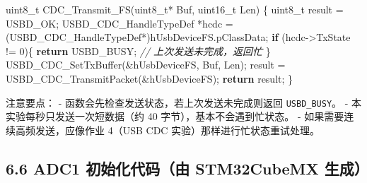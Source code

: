 \documentclass[
  chinese,
  UTF8,
  oneside,
  openany]{ctexbook}
\newenvironment{Shaded}{}{}
\newcommand{\CommentTok}[1]{\textcolor[rgb]{0.38,0.63,0.69}{\textit{#1}}}
\newcommand{\ControlFlowTok}[1]{\textcolor[rgb]{0.00,0.44,0.13}{\textbf{#1}}}
\newcommand{\DataTypeTok}[1]{\textcolor[rgb]{0.56,0.13,0.00}{#1}}
\newcommand{\DecValTok}[1]{\textcolor[rgb]{0.25,0.63,0.44}{#1}}
\newcommand{\NormalTok}[1]{#1}
\newcommand{\OperatorTok}[1]{\textcolor[rgb]{0.40,0.40,0.40}{#1}}
\begin{document}
\begin{Shaded}
\begin{Highlighting}[]
\DataTypeTok{uint8\_t}\NormalTok{ CDC\_Transmit\_FS}\OperatorTok{(}\DataTypeTok{uint8\_t}\OperatorTok{*}\NormalTok{ Buf}\OperatorTok{,} \DataTypeTok{uint16\_t}\NormalTok{ Len}\OperatorTok{)}
\OperatorTok{\{}
    \DataTypeTok{uint8\_t}\NormalTok{ result }\OperatorTok{=}\NormalTok{ USBD\_OK}\OperatorTok{;}
\NormalTok{    USBD\_CDC\_HandleTypeDef }\OperatorTok{*}\NormalTok{hcdc }\OperatorTok{=} \OperatorTok{(}\NormalTok{USBD\_CDC\_HandleTypeDef}\OperatorTok{*)}\NormalTok{hUsbDeviceFS}\OperatorTok{.}\NormalTok{pClassData}\OperatorTok{;}
    \ControlFlowTok{if} \OperatorTok{(}\NormalTok{hcdc}\OperatorTok{{-}\textgreater{}}\NormalTok{TxState }\OperatorTok{!=} \DecValTok{0}\OperatorTok{)\{}
        \ControlFlowTok{return}\NormalTok{ USBD\_BUSY}\OperatorTok{;}  \CommentTok{// 上次发送未完成，返回忙}
    \OperatorTok{\}}
\NormalTok{    USBD\_CDC\_SetTxBuffer}\OperatorTok{(\&}\NormalTok{hUsbDeviceFS}\OperatorTok{,}\NormalTok{ Buf}\OperatorTok{,}\NormalTok{ Len}\OperatorTok{);}
\NormalTok{    result }\OperatorTok{=}\NormalTok{ USBD\_CDC\_TransmitPacket}\OperatorTok{(\&}\NormalTok{hUsbDeviceFS}\OperatorTok{);}
    \ControlFlowTok{return}\NormalTok{ result}\OperatorTok{;}
\OperatorTok{\}}
\end{Highlighting}
\end{Shaded}

注意要点： - 函数会先检查发送状态，若上次发送未完成则返回
\texttt{USBD\_BUSY}。 - 本实验每秒只发送一次短数据（约 40
字节），基本不会遇到忙状态。 - 如果需要连续高频发送，应像作业 4（USB CDC
实验）那样进行忙状态重试处理。

\subsection{6.6 ADC1 初始化代码（由 STM32CubeMX
生成）}\label{adc1-ux521dux59cbux5316ux4ee3ux7801ux7531-stm32cubemx-ux751fux6210}
\end{document}
